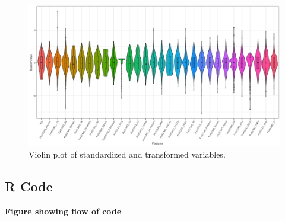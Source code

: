 \documentclass[12pt,]{article}
\begin{document}
\begin{figure}[H]

{\centering \includegraphics[width=1\linewidth]{images/violinplot_standardized} 

}

\caption{\label{fig.ensemble-imputation}Violin plot of standardized and transformed variables.}\label{fig:violin-yeojohnson}
\end{figure}

\subsection{R Code}\label{r-code}

\textbf{Figure showing flow of code}

\newpage


\end{document}
